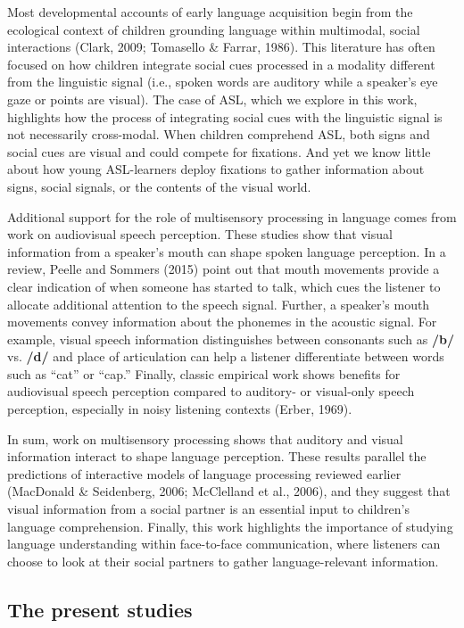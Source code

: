 \documentclass[,man,floatsintext]{apa6}
\begin{document}
Most developmental accounts of early language acquisition begin from the
ecological context of children grounding language within multimodal,
social interactions (Clark, 2009; Tomasello \& Farrar, 1986). This
literature has often focused on how children integrate social cues
processed in a modality different from the linguistic signal (i.e.,
spoken words are auditory while a speaker's eye gaze or points are
visual). The case of ASL, which we explore in this work, highlights how
the process of integrating social cues with the linguistic signal is not
necessarily cross-modal. When children comprehend ASL, both signs and
social cues are visual and could compete for fixations. And yet we know
little about how young ASL-learners deploy fixations to gather
information about signs, social signals, or the contents of the visual
world.

Additional support for the role of multisensory processing in language
comes from work on audiovisual speech perception. These studies show
that visual information from a speaker's mouth can shape spoken language
perception. In a review, Peelle and Sommers (2015) point out that mouth
movements provide a clear indication of when someone has started to
talk, which cues the listener to allocate additional attention to the
speech signal. Further, a speaker's mouth movements convey information
about the phonemes in the acoustic signal. For example, visual speech
information distinguishes between consonants such as \textbf{/b/} vs.
\textbf{/d/} and place of articulation can help a listener differentiate
between words such as \enquote{cat} or \enquote{cap.} Finally, classic
empirical work shows benefits for audiovisual speech perception compared
to auditory- or visual-only speech perception, especially in noisy
listening contexts (Erber, 1969).

In sum, work on multisensory processing shows that auditory and visual
information interact to shape language perception. These results
parallel the predictions of interactive models of language processing
reviewed earlier (MacDonald \& Seidenberg, 2006; McClelland et al.,
2006), and they suggest that visual information from a social partner is
an essential input to children's language comprehension. Finally, this
work highlights the importance of studying language understanding within
face-to-face communication, where listeners can choose to look at their
social partners to gather language-relevant information.

\hypertarget{the-present-studies}{%
\subsection{The present studies}\label{the-present-studies}}
\end{document}
